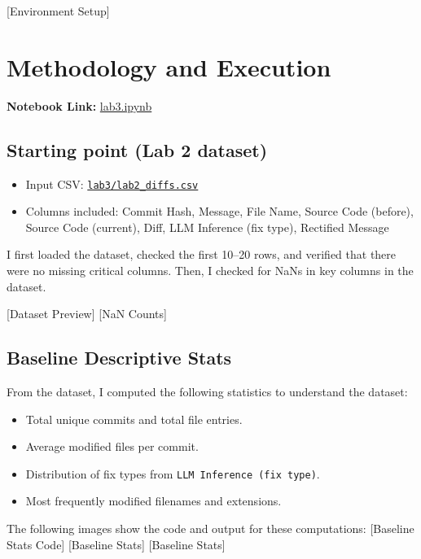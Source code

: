 \documentclass[10pt,a4paper]{report}
\begin{document}
[Environment Setup]

\section{Methodology and Execution}

\textbf{Notebook Link:} \href{https://github.com/ShardulJunagade/cs202-stt/blob/main/lab3/lab3.ipynb}{lab3.ipynb}

\subsection{Starting point (Lab 2 dataset)}
\begin{itemize}[itemsep=0.05em, topsep=0pt]
    \item Input CSV: \href{https://github.com/ShardulJunagade/cs202-stt/blob/main/lab3/lab2_diffs.csv}{\texttt{lab3/lab2\_diffs.csv}}
    \item Columns included: Commit Hash, Message, File Name, Source Code (before), Source Code (current), Diff, LLM Inference (fix type), Rectified Message
\end{itemize}

I first loaded the dataset, checked the first 10--20 rows, and verified that there were no missing critical columns. Then, I checked for NaNs in key columns in the dataset.

[Dataset Preview]
[NaN Counts]

\subsection{Baseline Descriptive Stats}
From the dataset, I computed the following statistics to understand the dataset:
\begin{itemize}[itemsep=0.05em, topsep=0pt]
    \item Total unique commits and total file entries.
    \item Average modified files per commit.
    \item Distribution of fix types from \texttt{LLM Inference (fix type)}.
    \item Most frequently modified filenames and extensions.
\end{itemize}

The following images show the code and output for these computations:
[Baseline Stats Code]
[Baseline Stats]
[Baseline Stats]
\end{document}
